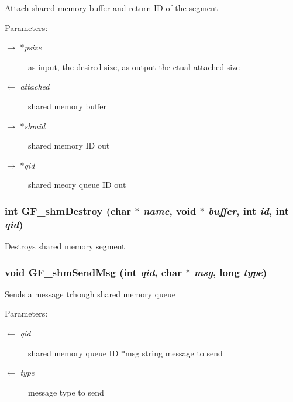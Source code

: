 Attach shared memory buffer and return ID of the segment \begin{Desc}
\item[Parameters:]
\begin{description}
\item[\mbox{$\rightarrow$} {\em $\ast$psize}]as input, the desired size, as output the ctual attached size \item[\mbox{$\leftarrow$} {\em attached}]shared memory buffer \item[\mbox{$\rightarrow$} {\em $\ast$shmid}]shared memory ID out \item[\mbox{$\rightarrow$} {\em $\ast$qid}]shared meory queue ID out \end{description}
\end{Desc}
\subsubsection{\setlength{\rightskip}{0pt plus 5cm}int GF\_\-shm\-Destroy (char $\ast$ {\em name}, void $\ast$ {\em buffer}, int {\em id}, int {\em qid})}\label{GF__shmem_8h_99a029265843ab9cc21d886341c015d4}


Destroys shared memory segment 
\subsubsection{\setlength{\rightskip}{0pt plus 5cm}void GF\_\-shm\-Send\-Msg (int {\em qid}, char $\ast$ {\em msg}, long {\em type})}\label{GF__shmem_8h_170f5e06b7f3793fedbbcd129548dc89}


Sends a message trhough shared memory queue \begin{Desc}
\item[Parameters:]
\begin{description}
\item[\mbox{$\leftarrow$} {\em qid}]shared memory queue ID  $\ast$msg string message to send \item[\mbox{$\leftarrow$} {\em type}]message type to send \end{description}
\end{Desc}
